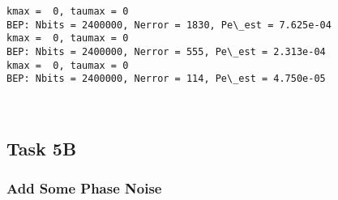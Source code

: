 \documentclass[11pt]{article}
\begin{document}
    \begin{Verbatim}[commandchars=\\\{\}]
kmax =  0, taumax = 0
BEP: Nbits = 2400000, Nerror = 1830, Pe\_est = 7.625e-04
kmax =  0, taumax = 0
BEP: Nbits = 2400000, Nerror = 555, Pe\_est = 2.313e-04
kmax =  0, taumax = 0
BEP: Nbits = 2400000, Nerror = 114, Pe\_est = 4.750e-05

    \end{Verbatim}

    \begin{center}
    \end{center}
    { \hspace*{\fill} \\}
    
    \subsection{Task 5B}\label{task-5b}

    \subsubsection{Add Some Phase Noise}\label{add-some-phase-noise}
\end{document}
